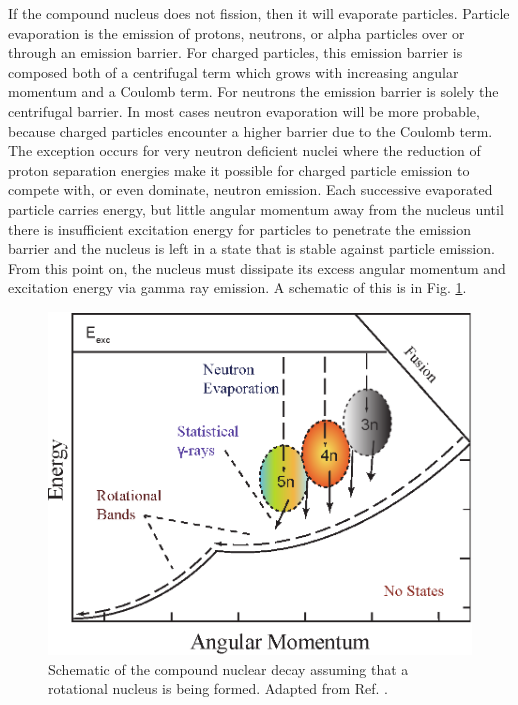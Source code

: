 If the compound nucleus does not fission, then it will evaporate particles. Particle evaporation is the emission of protons, neutrons, or alpha particles over or through an emission barrier. For charged particles, this emission barrier is composed both of a centrifugal term which grows with increasing angular momentum and a Coulomb term. For neutrons the emission barrier is solely the centrifugal barrier. In most cases neutron evaporation will be more probable, because charged particles encounter a higher barrier due to the Coulomb term. The exception occurs for very neutron deficient nuclei where the reduction of proton separation energies make it possible for charged particle emission to compete with, or even dominate, neutron emission. Each successive evaporated particle carries energy, but little angular momentum away from the nucleus until there is insufficient excitation energy for particles to penetrate the emission barrier and the nucleus is left in a state that is stable against particle emission. From this point on, the nucleus must dissipate its excess angular momentum and excitation energy via gamma ray emission. A schematic of this is in Fig. \ref{fig:chp3-emission-schematic}.

\begin{figure}[h!]
	\centerline{\includegraphics[height=0.3\textheight]{./img/c3/evaporation_chans.eps}}
	\caption{Schematic of the compound nuclear decay assuming that a rotational nucleus is being formed. Adapted from Ref. \cite{danielDissertation}.}
	\label{fig:chp3-emission-schematic}
\end{figure}

